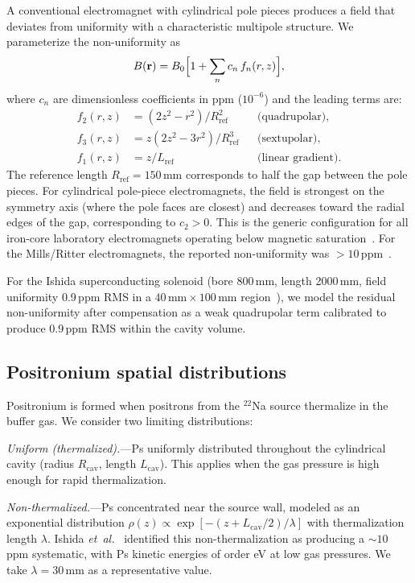 \documentclass[twocolumn,pra,aps,superscriptaddress,floatfix,10pt]{revtex4-2}
\begin{document}
A conventional electromagnet with cylindrical pole pieces produces a field that deviates from uniformity with a characteristic multipole structure. We parameterize the non-uniformity as
\begin{equation}
  B(\mathbf{r}) = B_0 \Bigl[1 + \sum_n c_n\, f_n(r,z)\Bigr],
  \label{eq:field_expansion}
\end{equation}
where $c_n$ are dimensionless coefficients in ppm ($10^{-6}$) and the leading terms are:
\begin{align}
  f_2(r,z) &= (2z^2 - r^2)/R_\mathrm{ref}^2 & &\text{(quadrupolar)}, \label{eq:quad} \\
  f_3(r,z) &= z(2z^2 - 3r^2)/R_\mathrm{ref}^3 & &\text{(sextupolar)}, \label{eq:sext} \\
  f_1(r,z) &= z/L_\mathrm{ref} & &\text{(linear gradient)}. \label{eq:lin}
\end{align}
The reference length $R_\mathrm{ref} = 150$\,mm corresponds to half the gap between the pole pieces. For cylindrical pole-piece electromagnets, the field is strongest on the symmetry axis (where the pole faces are closest) and decreases toward the radial edges of the gap, corresponding to $c_2 > 0$. This is the generic configuration for all iron-core laboratory electromagnets operating below magnetic saturation~\cite{Rich1981}. For the Mills/Ritter electromagnets, the reported non-uniformity was $> 10$\,ppm~\cite{Ritter1984}.

For the Ishida superconducting solenoid (bore 800\,mm, length 2000\,mm, field uniformity 0.9\,ppm RMS in a $40\,\mathrm{mm} \times 100$\,mm region~\cite{Ishida2014}), we model the residual non-uniformity after compensation as a weak quadrupolar term calibrated to produce 0.9\,ppm RMS within the cavity volume.

\subsection{Positronium spatial distributions}
\label{sec:ps_dist}

Positronium is formed when positrons from the $^{22}$Na source thermalize in the buffer gas. We consider two limiting distributions:

\textit{Uniform (thermalized).}---Ps uniformly distributed throughout the cylindrical cavity (radius $R_\mathrm{cav}$, length $L_\mathrm{cav}$). This applies when the gas pressure is high enough for rapid thermalization.

\textit{Non-thermalized.}---Ps concentrated near the source wall, modeled as an exponential distribution $\rho(z) \propto \exp[-(z + L_\mathrm{cav}/2)/\lambda]$ with thermalization length $\lambda$. Ishida \textit{et~al.}~\cite{Ishida2014} identified this non-thermalization as producing a $\sim 10$\,ppm systematic, with Ps kinetic energies of order eV at low gas pressures. We take $\lambda = 30$\,mm as a representative value.
\end{document}
